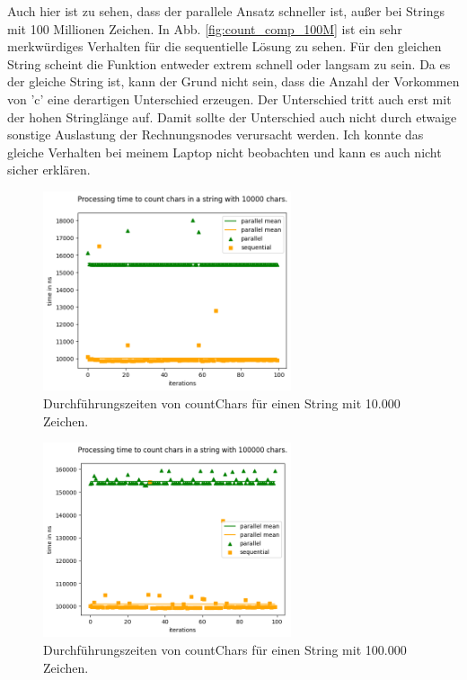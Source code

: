 \documentclass[plainarticle,zihtitle,german,final,hyperref,utf8]{zihpub}
\begin{document}
Auch hier ist zu sehen, dass der parallele Ansatz schneller ist, außer bei Strings mit 100 Millionen Zeichen. In Abb. \ref{fig:count_comp_100M} ist ein sehr merkwürdiges Verhalten für die sequentielle Lösung zu sehen. Für den gleichen String scheint die Funktion entweder extrem schnell oder langsam zu sein. Da es der gleiche String ist, kann der Grund nicht sein, dass die Anzahl der Vorkommen von 'c' eine derartigen Unterschied erzeugen. Der Unterschied tritt auch erst mit der hohen Stringlänge auf. Damit sollte der Unterschied auch nicht durch etwaige sonstige Auslastung der Rechnungsnodes verursacht werden.
Ich konnte das gleiche Verhalten bei meinem Laptop nicht beobachten und kann es auch nicht sicher erklären.
\begin{figure}[h]
	\begin{center}
		\includegraphics[width=0.65\textwidth]{images/comp_count_10000.png}
		\caption{Durchführungszeiten von countChars für einen String mit 10.000 Zeichen.}
	\end{center}
\end{figure}
\begin{figure}[h]
	\begin{center}
		\includegraphics[width=0.65\textwidth]{images/comp_count_100000.png}
		\caption{Durchführungszeiten von countChars für einen String mit 100.000 Zeichen.}
	\end{center}
\end{figure}
\end{document}
